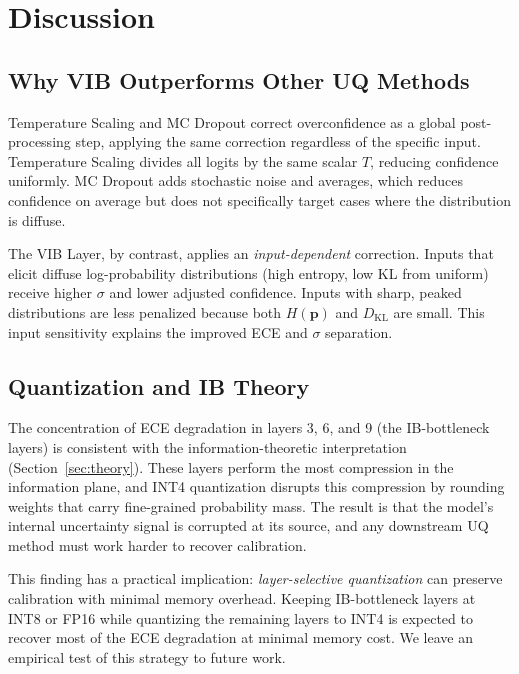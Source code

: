 \documentclass[conference]{IEEEtran}
\begin{document}
\section{Discussion}
\label{sec:discussion}

\subsection{Why VIB Outperforms Other UQ Methods}

Temperature Scaling and MC Dropout correct overconfidence as a global
post-processing step, applying the same correction regardless of the
specific input. Temperature Scaling divides all logits by the same
scalar $T$, reducing confidence uniformly. MC Dropout adds
stochastic noise and averages, which reduces confidence on average
but does not specifically target cases where the distribution is
diffuse.

The VIB Layer, by contrast, applies an \emph{input-dependent}
correction. Inputs that elicit diffuse log-probability distributions
(high entropy, low KL from uniform) receive higher $\sigma$ and lower
adjusted confidence. Inputs with sharp, peaked distributions are less
penalized because both $H(\mathbf{p})$ and $D_{\text{KL}}$ are small.
This input sensitivity explains the improved ECE and $\sigma$ separation.

\subsection{Quantization and IB Theory}

The concentration of ECE degradation in layers 3, 6, and 9 (the
IB-bottleneck layers) is consistent with the information-theoretic
interpretation (Section~\ref{sec:theory}). These layers perform the
most compression in the information plane, and INT4 quantization
disrupts this compression by rounding weights that carry fine-grained
probability mass. The result is that the model's internal uncertainty
signal is corrupted at its source, and any downstream UQ method must
work harder to recover calibration.

This finding has a practical implication: \emph{layer-selective
quantization} can preserve calibration with minimal memory overhead.
Keeping IB-bottleneck layers at INT8 or FP16 while quantizing the
remaining layers to INT4 is expected to recover most of the ECE
degradation at minimal memory cost. We leave an empirical test of
this strategy to future work.
\end{document}

